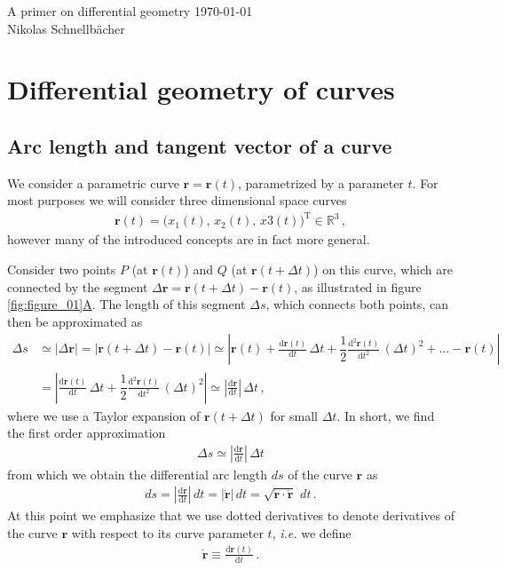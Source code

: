 \documentclass[11pt, DINA4, fleqn]{amsart}
\def\df{\mathrm{d}\xspace}
\newcommand{\dd}[2]{\frac{\df#1}{\df#2}}
\newcommand{\ddd}[2]{\frac{\df^2#1}{\df#2^2}}
\def\vr{\boldsymbol{r}\xspace}
\def\vrd{\dot{\vr}\xspace}
\begin{document}
\begin{flushleft}
{\sc \LARGE A primer on differential geometry} \hfill \today \\
\medskip
\Large
Nikolas Schnellbächer \underline{\hspace{6.53in}} \\
\end{flushleft}

\section{Differential geometry of curves}
\subsection{Arc length and tangent vector of a curve}

We consider a parametric curve $\vr = \vr(t)$, parametrized by a parameter $t$.
For most purposes we will consider three dimensional space curves
\begin{align}
\vr(t) = \bigl(x_1(t),\, x_2(t),\, x3(t)\bigl)^{\text{T}}\in \mathbb{R}^3 \, ,
\end{align}
however many of the introduced concepts are in fact more general.

Consider two points $P$ (at $\vr(t)$) and $Q$ (at $\vr(t+ \Delta t)$) on this curve, which are connected by the segment $\Delta\vr = \vr(t+\Delta t) - \vr(t)$, as illustrated in figure \ref{fig:figure_01}\hyperref[fig:figure_01]{A}. The length of this segment $\Delta s$, which connects both points, can then be approximated as
\begin{align}
\Delta s &\simeq |\Delta \vr| = 
\left| \vr(t + \Delta t) - \vr(t)
\right| \simeq
\left|
\vr(t) + \dd{\vr(t)}{t}\, \Delta t + \dfrac{1}{2}\ddd{\vr(t)}{t}\, (\Delta t)^2 + \dots
- \vr(t)
\right| \\
&= 
\left|
\dd{\vr(t)}{t}\, \Delta t + \dfrac{1}{2}\ddd{\vr(t)}{t}\, (\Delta t)^2
\right|
\simeq \left|\dd{\vr}{t}\right| \, \Delta t \, ,
\end{align}
where we use a Taylor expansion of $\vr(t+\Delta t)$ for small $\Delta t$. In short, we find the first order approximation
\begin{align}
\Delta s \simeq \left|\dd{\vr}{t}\right| \, \Delta t
\end{align}
from which we obtain the differential arc length $ds$ of the curve $\vr$ as
\begin{align}
ds = \left|\dd{\vr}{t}\right| \, dt
= \left|\vrd\right| \, dt = \sqrt{\vrd \cdot \vrd} \,\, dt \, .
\label{eq:diffArc}
\end{align}
At this point we emphasize
that we use dotted derivatives to denote derivatives of the curve $\vr$ with respect to its curve parameter $t$, \textit{i.e.} we define
\begin{align}
\vrd \equiv \dd{\vr(t)}{t} \, .
\end{align}
\end{document}
